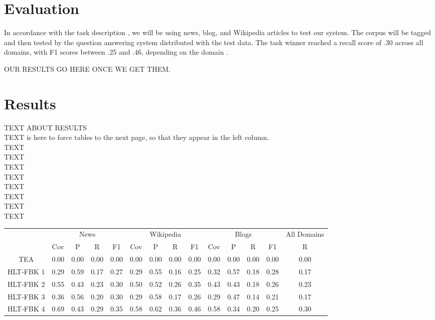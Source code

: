 \documentclass[11pt,letterpaper]{article}
\begin{document}
\section{Evaluation}

In accordance with the task description \cite{Llorens:15}, we will be using news, blog, and Wikipedia articles to test our system. The corpus will be tagged and then tested by the question answering system distributed with the test data. The task winner reached a recall score of .30 across all domains, with F1 scores between .25 and .46, depending on the domain \cite{Mirza:15}. 

OUR RESULTS GO HERE ONCE WE GET THEM.


\section{Results}

TEXT ABOUT RESULTS
\\TEXT is here to force tables to the next page, so that they appear in the left column.
\\TEXT\\TEXT
\\TEXT\\TEXT\\TEXT\\TEXT\\TEXT\\TEXT


\begin{center}
\begin{tabular}{c|cccc|cccc|cccc||c}

\multirow{2}{*}{} &
	\multicolumn{4}{c}{News} & 
	\multicolumn{4}{|c}{Wikipedia} & 
	\multicolumn{4}{|c||}{Blogs} & 
	\multicolumn{1}{c}{All Domains} \\
	
	& Cov & P & R & F1 
	& Cov & P & R & F1 
	& Cov & P & R & F1 
	& R\\
	\hline

	TEA & 
	0.00 & 0.00 & 0.00 & 0.00 & 
	0.00 & 0.00 & 0.00 & 0.00 & 
	0.00 & 0.00 & 0.00 & 0.00 & 
	0.00 \\

	HLT-FBK 1 &
	0.29 & 0.59 & 0.17 & 0.27 &
	0.29 & 0.55 & 0.16 & 0.25 &
	0.32 & 0.57 & 0.18 & 0.28 &
	0.17 \\
	
	HLT-FBK 2 &
	0.55 & 0.43 & 0.23 & 0.30 &
	0.50 & 0.52 & 0.26 & 0.35 &
	0.43 & 0.43 & 0.18 & 0.26 &
	0.23 \\
	
	HLT-FBK 3 &
	0.36 & 0.56 & 0.20 & 0.30 &
	0.29 & 0.58 & 0.17 & 0.26 &
	0.29 & 0.47 & 0.14 & 0.21 &
	0.17 \\
	
	HLT-FBK 4 &
	0.69 & 0.43 & 0.29 & 0.35 &
	0.58 & 0.62 & 0.36 & 0.46 &
	0.58 & 0.34 & 0.20 & 0.25 & 
	0.30 \\

\end{tabular}
\end{center}
\end{document}
